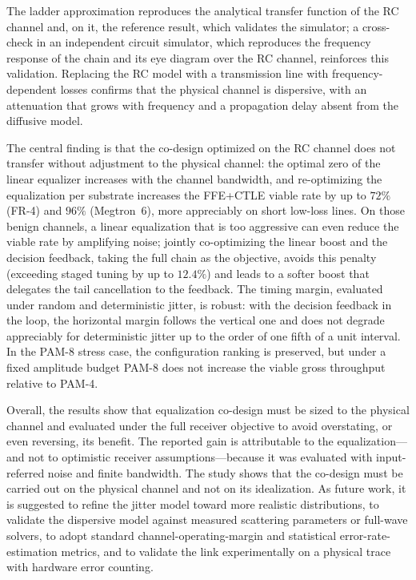 \documentclass{ieeeaccess}
\begin{document}
The ladder approximation reproduces the analytical transfer function of the
RC channel and, on it, the reference result, which validates the simulator;
a cross-check in an independent circuit simulator, which reproduces the
frequency response of the chain and its eye diagram over the RC channel,
reinforces this validation. Replacing the RC model with a transmission line
with frequency-dependent losses confirms that the physical channel is
dispersive, with an attenuation that grows with frequency and a propagation
delay absent from the diffusive model.

The central finding is that the co-design optimized on the RC channel does
not transfer without adjustment to the physical channel: the optimal zero of
the linear equalizer increases with the channel bandwidth, and re-optimizing
the equalization per substrate increases the FFE+CTLE viable rate by up to
$72\%$ (FR-4) and $96\%$ (Megtron~6), more appreciably on short low-loss
lines. On
those benign channels, a linear equalization that is too aggressive can even
reduce the viable rate by amplifying noise; jointly co-optimizing the linear
boost and the decision feedback, taking the full chain as the objective,
avoids this penalty (exceeding staged tuning by up to $12.4\%$) and leads to
a softer boost that delegates the tail cancellation to the feedback. The
timing margin, evaluated under random and deterministic jitter, is robust:
with the decision feedback in the loop, the horizontal margin follows the
vertical one and does not degrade appreciably for deterministic jitter up to
the order of one fifth of a unit interval. In the PAM-8 stress case, the
configuration ranking is preserved, but under a fixed amplitude budget PAM-8
does not increase the viable gross throughput relative to PAM-4.

Overall, the results show that equalization co-design must be sized to the
physical channel and evaluated under the full receiver objective to avoid
overstating, or even reversing, its benefit. The reported gain is attributable
to the equalization---and not to optimistic receiver assumptions---because it
was evaluated with input-referred noise and finite bandwidth. The study shows
that the co-design must be carried out on the physical channel and not on its
idealization. As future work, it is suggested to refine the jitter model
toward more realistic distributions, to validate the dispersive model against
measured scattering parameters or full-wave solvers, to adopt standard
channel-operating-margin and statistical error-rate-estimation metrics, and
to validate the link experimentally on a physical trace with hardware error
counting.
\end{document}
